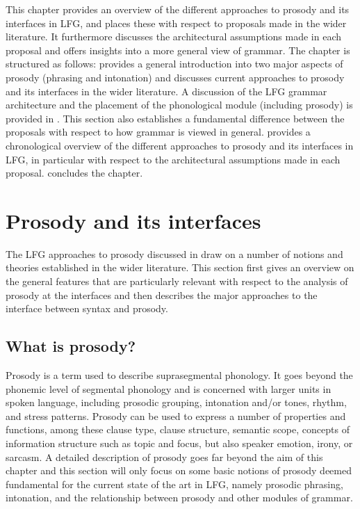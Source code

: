 \documentclass[output=paper,hidelinks]{langscibook}
\begin{document}
This chapter provides an overview of the different approaches to prosody and its interfaces in LFG, and places these with respect to proposals made in the wider literature. It furthermore discusses the architectural assumptions made in each proposal and offers insights into a more general view of grammar. The chapter is structured as follows:  provides a general introduction into two major aspects of prosody (phrasing and intonation)  and discusses current approaches to prosody and its interfaces in the wider literature. A discussion of the LFG grammar architecture and the placement of the phonological module (including prosody) is provided in . This section also establishes a fundamental difference between the proposals with respect to how grammar is viewed in general.  provides 
 a chronological overview of the different approaches to prosody and its interfaces in LFG, in particular with respect to the architectural assumptions made in each proposal.  concludes the chapter.


\section{Prosody and its interfaces}
\label{sec:pros_interfaces}
The LFG approaches to prosody discussed in  draw on a number of notions and theories established in the wider literature. This section first gives an overview on the general features that are particularly relevant with respect to the analysis of prosody at the interfaces and then describes the major approaches to the interface between syntax and prosody. 

\subsection{What is prosody?}
\label{subsec:what_pros}
\noindent Prosody is a term used to describe suprasegmental phonology. It goes beyond the phonemic level of segmental phonology and is concerned with larger units in spoken language, including prosodic grouping, intonation and/or tones, rhythm, and stress patterns. Prosody can be used to express a number of properties and functions, among these clause type, clause structure, semantic scope, concepts of information structure such as topic and focus, but also speaker emotion, irony, or sarcasm. A detailed description of prosody goes far beyond the aim of this chapter and this section will only focus on some basic notions of prosody deemed fundamental for the current state of the art in LFG, namely prosodic phrasing, intonation, and the relationship between prosody and other modules of grammar.
\end{document}
